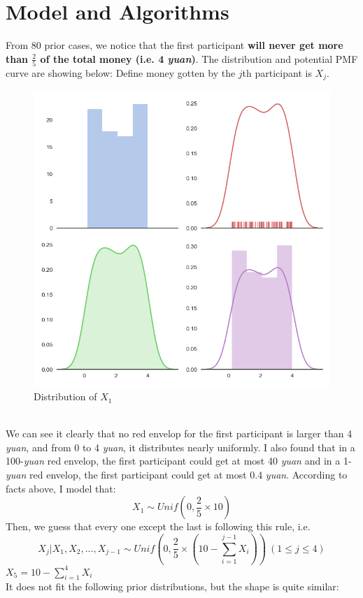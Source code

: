 \documentclass[10pt,journal]{IEEEtran}
\begin{document}
\section{Model and Algorithms}
	From 80 prior cases, we notice that the first participant \textbf{will never get more than \(\frac{2}{5}\) of the total money (i.e. 4 \emph{yuan})}. The distribution and potential PMF curve are showing below:	
	Define money gotten by the \(j\)th participant is \(X_j\).
	\\
\begin{figure}[!ht]
	\centering
	\includegraphics[width=0.7\columnwidth,height=0.6\linewidth]{10_1.png}
	\caption{Distribution of \(X_1\)}
\end{figure}
\\
We can see it clearly that no red envelop for the first participant is larger than 4 \emph{yuan}, and from 0 to 4 \emph{yuan}, it distributes nearly uniformly. I also found that in a 100-\emph{yuan} red envelop, the first participant could get at most 40 \emph{yuan} and in a 1-\emph{yuan} red envelop, the first participant could get at most 0.4 \emph{yuan}. According to facts above, I model that:
\begin{displaymath}
	X_1\sim Unif(0,\frac{2}{5}\times10)
\end{displaymath}
Then, we guess that every one except the last is following this rule, i.e.
\begin{displaymath}
X_j|X_1,X_2,...,X_{j-1}\sim Unif(0,\frac{2}{5}\times(10-\sum_{i=1}^{j-1}X_i))\ (1\leq j\leq 4)
\end{displaymath}
\(X_5=10-\sum_{i=1}^{4}X_i\)
\\
It does not fit the following prior distributions, but the shape is quite similar:
\end{document}
